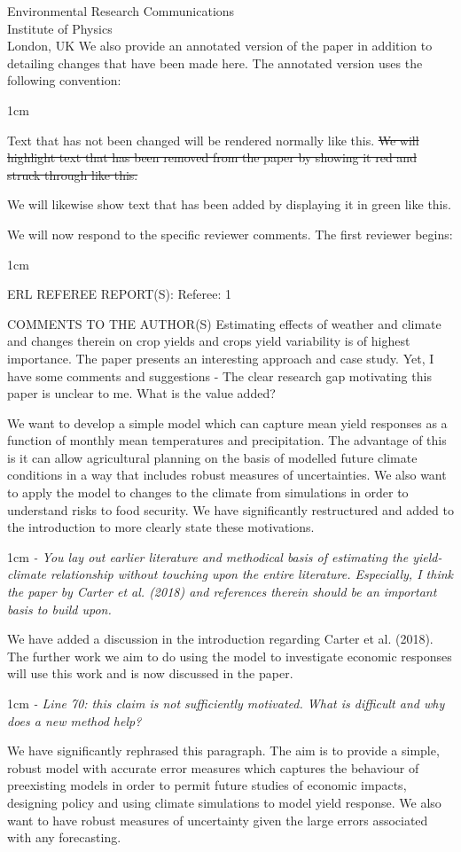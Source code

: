 \documentclass{letter}
\newcommand{\remove}[1]{   
    \color{red}
    \sout{#1}
    }
\newcommand{\add}[1]{   
    \color{green}
    #1
    }
\newcommand{\paper}[1]{   
    \begin{adjustwidth}{1cm}{}
    #1
    \end{adjustwidth}
    }
\newcommand{\review}[1]{   
    \begin{adjustwidth}{1cm}{}
    \em{#1}
    \end{adjustwidth}
    }
\begin{document}
\begin{letter}{Environmental Research Communications \\ Institute of Physics \\ London, UK}
We also provide an annotated version of the paper in addition to detailing changes that have been made here. The annotated version uses the following convention:
\paper{
Text that has not been changed will be rendered normally like this. \remove{We will highlight text that has been removed from the paper by showing it red and struck through like this.}\add{We will likewise show text that has been added by displaying it in green like this.}
}



We will now respond to the specific reviewer comments. The first reviewer begins:

\review{
ERL REFEREE REPORT(S):
Referee: 1

COMMENTS TO THE AUTHOR(S)
Estimating effects of weather and climate and changes therein on crop yields and crops yield variability is of highest importance. The paper presents an interesting approach and case study. Yet, I have some comments and suggestions
- The clear research gap motivating this paper is unclear to me. What is the value added?
}

We want to develop a simple model which can capture mean yield responses as a function of monthly mean temperatures and precipitation. The advantage of this is it can allow agricultural planning on the basis of modelled future climate conditions in a way that includes robust measures of uncertainties. We also want to apply the model to changes to the climate from simulations in order to understand risks to food security. We have significantly restructured and added to the introduction to more clearly state these motivations.

\review{
- You lay out earlier literature and methodical basis of estimating the yield-climate relationship without touching upon the entire literature. Especially, I think the paper by Carter et al. (2018) and references therein should be an important basis to build upon.
}

We have added a discussion in the introduction regarding Carter et al. (2018). The further work we aim to do using the model to investigate economic responses will use this work and is now discussed in the paper. 

\review{
- Line 70: this claim is not sufficiently motivated. What is difficult and why does a new method help?
}

We have significantly rephrased this paragraph. The aim is to provide a simple, robust model with accurate error measures which captures the behaviour of preexisting models in order to permit future studies of economic impacts, designing policy and using climate simulations to model yield response. We also want to have robust measures of uncertainty given the large errors associated with any forecasting.


\end{letter}
\end{document}
